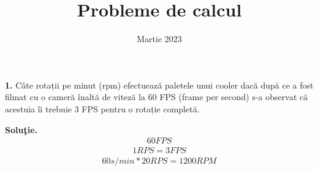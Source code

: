\documentclass{article}
\title{Probleme de calcul}
\author{}
\date{Martie 2023}
\begin{document}
\maketitle

\textbf{1.} Câte rotații pe minut (rpm) efectuează paletele unui cooler dacă după ce a fost filmat cu o cameră înaltă de viteză la $60$ FPS (frame per second) s-a observat că acestuia îi trebuie $3$ FPS pentru o rotație completă.

\textbf{Solu\c{t}ie.} 
\begin{align*}
    60 FPS
\end{align*}
\begin{align*}
1RPS=3FPS
\end{align*}
\begin{align*}
60 s/min * 20RPS=1200 RPM
\end{align*}
\end{document}
